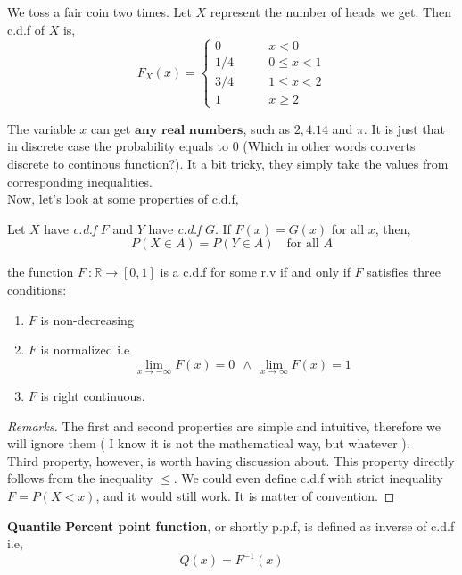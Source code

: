 \begin{example}
    We toss a fair coin two times. Let $X$ represent the number of heads we get. Then c.d.f of $X$ is,
    \[F_X(x) =
        \begin{cases}
            0 \qquad &x < 0\\
            1/4 \qquad &0 \le x <1 \\
            3/4 \qquad &1 \leq x < 2 \\
            1 \qquad &x \ge 2
        \end{cases}
    \]
\end{example}

The variable $x$ can get $\textbf{any real numbers}$, such as $2, 4.14$ and $\pi$. It is just that in discrete case the probability equals
to $0$ (Which in other words converts discrete to continous function?). It a bit tricky, they simply take the values from corresponding inequalities.
\\
Now, let's look at some properties of c.d.f,
\begin{theorem}
    Let $X$ have \textit{c.d.f} $F$ and $Y$  have \textit{c.d.f} $G$. If $F(x)=G(x)$ for all $x$, then,
    \[ P(X \in A) = P(Y \in A) \quad \text{for all $A$} \]
\end{theorem}

\begin{theorem}
    the function $F \ : \mathbb{R} \rightarrow [0,1]$ is a c.d.f for some r.v if and only if $F$ satisfies three conditions:
    \begin{enumerate}
        \item $F$ is non-decreasing
        \item $F$ is normalized i.e \[ \lim_{x \rightarrow -\infty} F(x) = 0\ \ \land \ \lim_{x \rightarrow \infty} F(x) =1 \]
        \item $F$ is right continuous.
    \end{enumerate}
    \begin{proof}[Remarks]
        The first and second properties are simple and intuitive, therefore we will ignore them ( I know it is not the mathematical way,
        but whatever   ). \\

        Third property, however, is worth having discussion about. This property directly follows from the inequality $\le$. We could even
        define c.d.f with strict inequality $F= P(X<x)$, and it would still work. It is matter of convention.
    \end{proof}
\end{theorem}
\begin{definition}
    \textbf{Quantile Percent point function}, or shortly p.p.f, is defined as inverse of c.d.f i.e,
    \[Q(x) = F^{-1}(x)\]
\end{definition}
